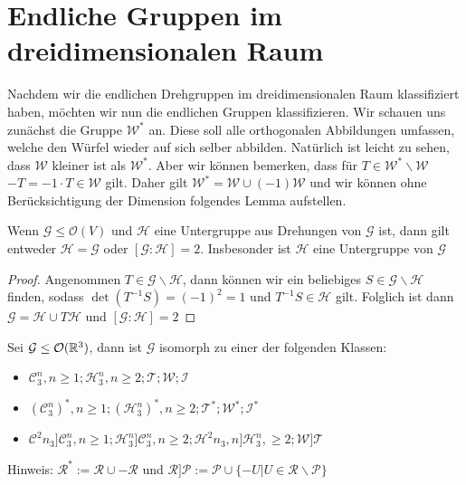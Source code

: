 \section{Endliche Gruppen im dreidimensionalen Raum} 
Nachdem wir die endlichen Drehgruppen im dreidimensionalen Raum klassifiziert haben, möchten wir nun die endlichen Gruppen klassifizieren. Wir schauen uns zunächst die Gruppe $\mathcal{W}^*$ an. Diese soll alle orthogonalen Abbildungen umfassen, welche den Würfel wieder auf sich selber abbilden. Natürlich ist leicht zu sehen, dass $\mathcal{W}$ kleiner ist als $\mathcal{W}^*$. Aber wir können bemerken, dass für $T \in \mathcal{W}^*\backslash\mathcal{W}$ \ $-T = -1 \cdot T \in \mathcal{W}$ gilt. Daher gilt $\mathcal{W}^*=\mathcal{W}\cup(-1)\mathcal{W}$ und wir können ohne Berücksichtigung der Dimension folgendes Lemma aufstellen.
\begin{lemma}
 Wenn $\mathcal{G}\leq\mathcal{O}(V)$ und $\mathcal{H}$ eine Untergruppe aus Drehungen von $\mathcal{G}$ ist, dann gilt entweder $\mathcal{H}=\mathcal{G}$ oder $[\mathcal{G}:\mathcal{H}]=2$. Insbesonder ist $\mathcal{H}$ eine Untergruppe von $\mathcal{G}$ 
\end{lemma}
\begin{proof}
 Angenommen $T\in\mathcal{G}\backslash\mathcal{H}$, dann können wir ein beliebiges $S\in\mathcal{G}\backslash\mathcal{H}$ finden, sodass $\det(T^{-1}S)=(-1)^2=1$ und $T^{-1}S\in\mathcal{H}$ gilt. Folglich ist dann $\mathcal{G}=\mathcal{H}\cup T \mathcal{H}$ und $[\mathcal{G}:\mathcal{H}]=2$
\end{proof}
\begin{theorem}
 Sei $\mathcal{G}\leq{\mathcal{O}(\mathbb{R}^3)}$, dann ist $\mathcal{G}$ isomorph zu einer der folgenden Klassen:
 \begin{itemize}
  \item $\mathcal{C}^n_3,n\geq1;\mathcal{H}^n_3,n\geq2;\mathcal{T};\mathcal{W};\mathcal{I}$
  \item $(\mathcal{C}^n_3)^*,n\geq1;(\mathcal{H}^n_3)^*,n\geq 2;\mathcal{T}^*;\mathcal{W}^*;\mathcal{I}^*$
  \item $\mathcal{C}^2n_3]\mathcal{C}^n_3,n\geq1;\mathcal{H}^n_3]\mathcal{C}^n_3,n\geq 2;\mathcal{H}^2n_3,n]\mathcal{H}^n_3,\geq2;\mathcal{W}]\mathcal{T}$
\end{itemize}
Hinweis: $\mathcal{R}^*:=\mathcal{R}\cup -\mathcal{R}$ und $\mathcal{R}]\mathcal{P}:=\mathcal{P}\cup \{-U|U\in \mathcal{R} \backslash \mathcal{P} \}$
\end{theorem}
